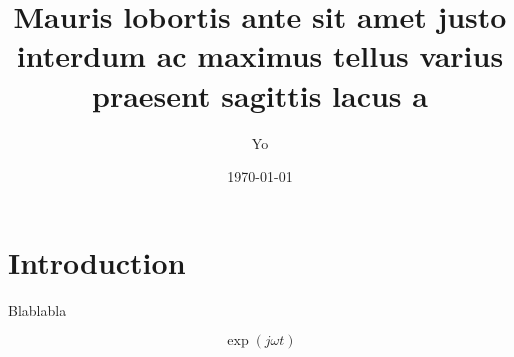 \documentclass{thesis}
\title{Mauris lobortis ante sit amet justo interdum ac maximus tellus varius praesent sagittis lacus a}
\author{Yo}
\date{\today}
\begin{document}
\maketitle

\chapter{Introduction}

Blablabla

$$ \exp{(j \omega t)} $$
\end{document}
